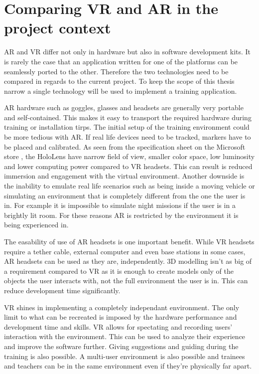 \documentclass[12pt, a4paper,oneside, nocenter]{thesis}
\begin{document}
\section{Comparing VR and AR in the project context}
AR and VR differ not only in hardware but also in software development kits. It is rarely the case that an application written for one of the platforms can be seamlessly ported to the other. Therefore the two technologies need to be compared in regards to the current project. To keep the scope of this thesis narrow a single technology will be used to implement a training application.
\par
AR hardware such as goggles, glasses and headsets are generally very portable and self-contained. This makes it easy to transport the required hardware during training or installation tirps. The initial setup of the training environment could be more tedious with AR. If real life devices need to be tracked, markers have to be placed and calibrated. As seen from the specification sheet on the Microsoft store \citeyearpar{hololens-specs}, the HoloLens have narrow field of view, smaller color space, low luminosity and lower computing power compared to VR headsets. This can result is reduced immersion and engagement with the virtual environment. Another downside is the inability to emulate real life scenarios such as being inside a moving vehicle or simulating an environment that is completely different from the one the user is in. For example it is impossible to simulate night missions if the user is in a brightly lit room. For these reasons AR is restricted by the environment it is being experienced in.
\par
The easability of use of AR headsets is one important benefit. While VR headsets require a tether cable, external computer and even base stations in some cases, AR headsets can be used as they are, independently. 3D modelling isn't as big of a requirement compared to VR as it is enough to create models only of the objects the user interacts with, not the full environment the user is in. This can reduce development time significantly.
\par
VR shines in implementing a completely independant environment. The only limit to what can be recreated is imposed by the hardware performance and development time and skills. VR allows for spectating and recording users' interaction with the environment. This can be used to analyze their experience and improve the software further. Giving suggestions and guiding during the training is also possible. A multi-user environment is also possible and trainees and teachers can be in the same environment even if they're physically far apart.
\end{document}
